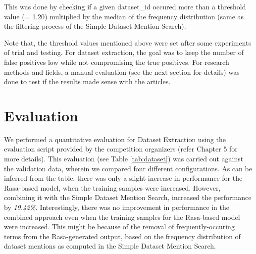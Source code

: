 \documentclass[runningheads]{llncs}
\begin{document}
\begin{enumerate}
		This was done by checking if a given dataset\_id occured more than a threshold value (= 1.20) multiplied by the median of the frequency distribution (same as the filtering process of the Simple Dataset Mention Search). %
	\end{enumerate} 
	
	Note that, the threshold values mentioned above were set after some experiments of trial and testing. For dataset extraction, the goal was to keep the number of false positives low while not compromising the true positives. %
	For research methods and fields, a manual evaluation (see the next section for details) was done to test if the results made sense with the articles.
	
	\section{Evaluation}
	We performed a quantitative evaluation for Dataset Extraction using the evaluation script provided by the competition organizers (refer Chapter 5 for more details). This evaluation (see Table \ref{tab:dataset}) was carried out against the validation data, wherein we compared four different configurations. As can be inferred from the table, %
	there was only a slight increase in performance for the Rasa-based model, when the training samples were increased. However, combining it with the Simple Dataset Mention Search, increased the performance by \emph{19.42\%}. Interestingly, there was no improvement in performance in the combined approach even when the training samples for the Rasa-based model were increased. This might be because of the removal of frequently-occuring terms from the Rasa-generated output, based on the frequency distribution of dataset mentions as computed in the Simple Dataset Mention Search.  \\
	
\end{document}
